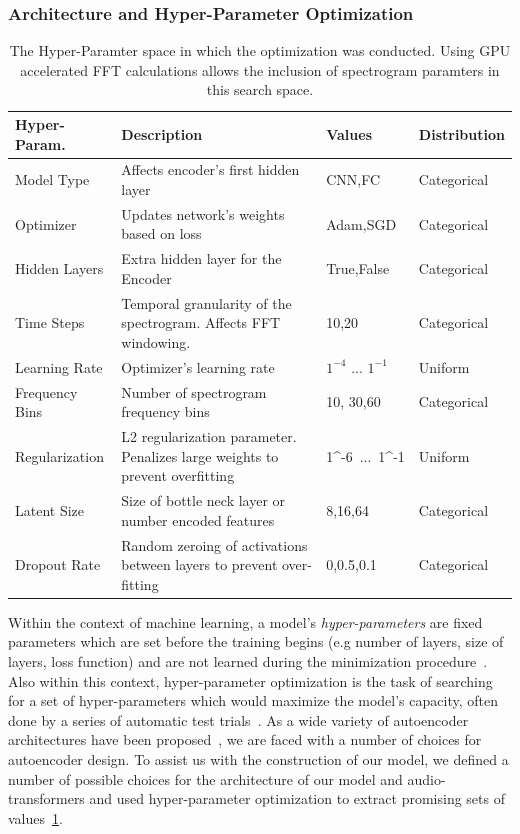 \documentclass[\main/thesis.tex]{subfiles}
\begin{document}
\subsubsection{Architecture and Hyper-Parameter Optimization}
\begin{table}[h!]
\label{table:hyper_prams}
\begin{tabular}{|p{28mm}|p{50mm}|p{21mm}|p{21mm}|}
\hline
Hyper-Param. & Description  & Values & Distribution\\ \hline
Model Type      &   Affects encoder's first hidden layer & CNN,FC & Categorical \\  \hline
Optimizer       & Updates network's weights based on loss & Adam,SGD & Categorical  \\  \hline
Hidden Layers   & Extra hidden layer for the Encoder & True,False & Categorical \\  \hline
Time Steps & Temporal granularity of the spectrogram. Affects FFT windowing. & 10,20 & Categorical  \\ \hline
Learning Rate   &    Optimizer's learning rate  & $1^{-4}$ ... $1^{-1}$ & Uniform      \\ \hline
Frequency Bins & Number of spectrogram frequency bins & 10, 30,60 & Categorical \\ \hline

Regularization  &  L2 regularization parameter. Penalizes large weights to prevent overfitting & 1^{-6}~...~1^{-1} & Uniform\\ \hline
Latent Size & Size of bottle neck layer or number encoded features & 8,16,64 & Categorical              \\ \hline
Dropout Rate & Random zeroing of activations between layers to prevent over-fitting & 0,0.5,0.1 & Categorical\\  \hline
\end{tabular}
\caption{The Hyper-Paramter space in which the optimization was conducted. Using GPU accelerated FFT calculations allows the inclusion of spectrogram paramters in this search space.}
\end{table}
Within the context of machine learning, a model's \emph{hyper-parameters} are fixed parameters which are set before the training begins (e.g number of layers, size of layers, loss function) and are not learned during the minimization procedure~\cite{bengio2000gradient}. Also within this context, hyper-parameter optimization is the task of searching for a set of hyper-parameters which would maximize the model's capacity, often done by a series of automatic test trials~\cite{bengio2000gradient,bergstra2011algorithms,bergstra2012random}. As a wide variety of autoencoder architectures have been proposed~\cite{aouameur2019neural,esling2018generative,gensler2016deep,zhang2016facing,pu2016variational}, we are faced with a number of choices for autoencoder design. To assist us with the construction of our model, we defined a number of possible choices for the architecture of our model and audio-transformers and used hyper-parameter optimization to extract promising sets of values~\ref{table:hyper_prams}. 
\end{document}
